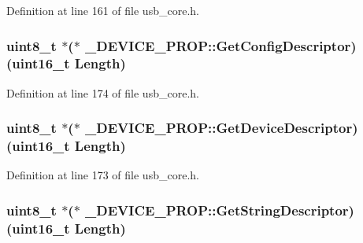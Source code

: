 Definition at line 161 of file usb\-\_\-core.\-h.

\hypertarget{struct___d_e_v_i_c_e___p_r_o_p_a3851a85ca88af6d71c93cc776af8df0e}{
\subsubsection[{Get\-Config\-Descriptor}]{ {\bf uint8\-\_\-t} $\ast$($\ast$ \-\_\-\-D\-E\-V\-I\-C\-E\-\_\-\-P\-R\-O\-P\-::\-Get\-Config\-Descriptor)({\bf uint16\-\_\-t} Length)}}\label{struct___d_e_v_i_c_e___p_r_o_p_a3851a85ca88af6d71c93cc776af8df0e}


Definition at line 174 of file usb\-\_\-core.\-h.

\hypertarget{struct___d_e_v_i_c_e___p_r_o_p_a118997b0ccb5c33a1c58c361f8494a27}{
\subsubsection[{Get\-Device\-Descriptor}]{ {\bf uint8\-\_\-t} $\ast$($\ast$ \-\_\-\-D\-E\-V\-I\-C\-E\-\_\-\-P\-R\-O\-P\-::\-Get\-Device\-Descriptor)({\bf uint16\-\_\-t} Length)}}\label{struct___d_e_v_i_c_e___p_r_o_p_a118997b0ccb5c33a1c58c361f8494a27}


Definition at line 173 of file usb\-\_\-core.\-h.

\hypertarget{struct___d_e_v_i_c_e___p_r_o_p_acd3ec31fe235c694b464a2d788bd7cdf}{
\subsubsection[{Get\-String\-Descriptor}]{ {\bf uint8\-\_\-t} $\ast$($\ast$ \-\_\-\-D\-E\-V\-I\-C\-E\-\_\-\-P\-R\-O\-P\-::\-Get\-String\-Descriptor)({\bf uint16\-\_\-t} Length)}}\label{struct___d_e_v_i_c_e___p_r_o_p_acd3ec31fe235c694b464a2d788bd7cdf}


